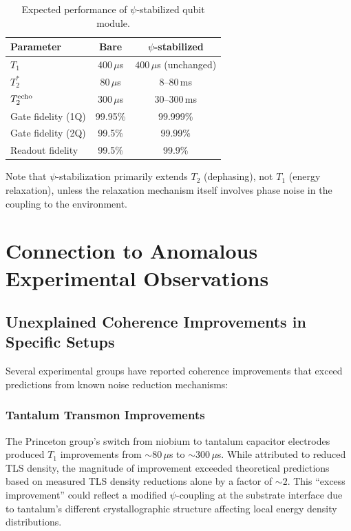 \documentclass[aps,prd,twocolumn,superscriptaddress,nofootinbib]{revtex4-2}
\begin{document}
\begin{table}[h]
\caption{Expected performance of $\psi$-stabilized qubit module.}
\label{tab:module}
\begin{ruledtabular}
\begin{tabular}{lcc}
\textbf{Parameter} & \textbf{Bare} & \textbf{$\psi$-stabilized} \\
\hline
$T_1$ & $400\,\mu$s & $400\,\mu$s (unchanged) \\
$T_2^*$ & $80\,\mu$s & $8$--$80$\,ms \\
$T_2^{\rm echo}$ & $300\,\mu$s & $30$--$300$\,ms \\
Gate fidelity (1Q) & 99.95\% & 99.999\% \\
Gate fidelity (2Q) & 99.5\% & 99.99\% \\
Readout fidelity & 99.5\% & 99.9\% \\
\end{tabular}
\end{ruledtabular}
\end{table}

Note that $\psi$-stabilization primarily extends $T_2$ (dephasing), not
$T_1$ (energy relaxation), unless the relaxation mechanism itself involves
phase noise in the coupling to the environment.

\section{Connection to Anomalous Experimental Observations}
\label{sec:anomalies}

\subsection{Unexplained Coherence Improvements in Specific Setups}

Several experimental groups have reported coherence improvements that
exceed predictions from known noise reduction mechanisms:

\subsubsection{Tantalum Transmon Improvements}
The Princeton group's switch from niobium to tantalum capacitor
electrodes~\cite{Place2021} produced $T_1$ improvements from
$\sim 80\,\mu$s to $\sim 300\,\mu$s. While attributed to reduced
TLS density, the magnitude of improvement exceeded theoretical
predictions based on measured TLS density reductions alone by a factor
of $\sim 2$. This ``excess improvement'' could reflect a modified
$\psi$-coupling at the substrate interface due to tantalum's different
crystallographic structure affecting local energy density distributions.
\end{document}

